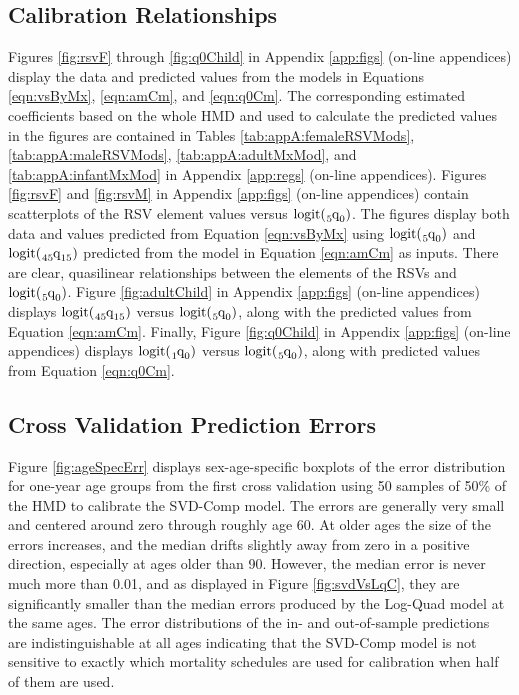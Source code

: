 \documentclass[11pt]{article}
\newcommand{\qf}{\tensor*[_5]{\mbox{q}}{_0}}
\newcommand{\qoz}{\tensor*[_1]{\mbox{q}}{_0}}
\newcommand{\qff}{\tensor*[_{45}]{\mbox{q}}{_{15}}}
\newcommand{\logit}{\mbox{logit}}
\begin{document}
\subsection{Calibration Relationships}

Figures \ref{fig:rsvF} through \ref{fig:q0Child} in Appendix \ref{app:figs} (on-line appendices) display the data and predicted values from the models in Equations \ref{eqn:vsByMx}, \ref{eqn:amCm}, and \ref{eqn:q0Cm}. The corresponding estimated coefficients based on the whole HMD and used to calculate the predicted values in the figures are contained in Tables \ref{tab:appA:femaleRSVMods}, \ref{tab:appA:maleRSVMods}, \ref{tab:appA:adultMxMod}, and \ref{tab:appA:infantMxMod} in Appendix \ref{app:regs}  (on-line appendices).  Figures \ref{fig:rsvF} and \ref{fig:rsvM} in Appendix \ref{app:figs} (on-line appendices) contain scatterplots of the RSV element values versus $\logit(\qf)$.  The figures display both data and values predicted from Equation \ref{eqn:vsByMx} using $\logit(\qf)$ and $\logit(\qff)$ predicted from the model in Equation \ref{eqn:amCm} as inputs.  There are clear, quasilinear relationships between the elements of the RSVs and $\logit(\qf)$. Figure \ref{fig:adultChild} in Appendix \ref{app:figs} (on-line appendices) displays $\logit(\qff)$ versus $\logit(\qf)$, along with the predicted values from Equation \ref{eqn:amCm}.  Finally, Figure \ref{fig:q0Child} in Appendix \ref{app:figs} (on-line appendices) displays $\logit(\qoz)$ versus $\logit(\qf)$, along with predicted values from Equation \ref{eqn:q0Cm}.


\subsection{Cross Validation Prediction Errors} \label{sec:res:crossVal}

Figure \ref{fig:ageSpecErr} displays sex-age-specific boxplots of the error distribution for one-year age groups from the first cross validation using 50 samples of 50\% of the HMD to calibrate the SVD-Comp model.  The errors are generally very small and centered around zero through roughly age 60.  At older ages the size of the errors increases, and the median drifts slightly away from zero in a positive direction, especially at ages older than 90.  However, the median error is never much more than 0.01, and as displayed in Figure \ref{fig:svdVsLqC}, they are significantly smaller than the median errors produced by the Log-Quad model at the same ages.  The error distributions of the in- and out-of-sample predictions are indistinguishable at all ages indicating that the SVD-Comp model is not sensitive to exactly which mortality schedules are used for calibration when half of them are used.
\end{document}
